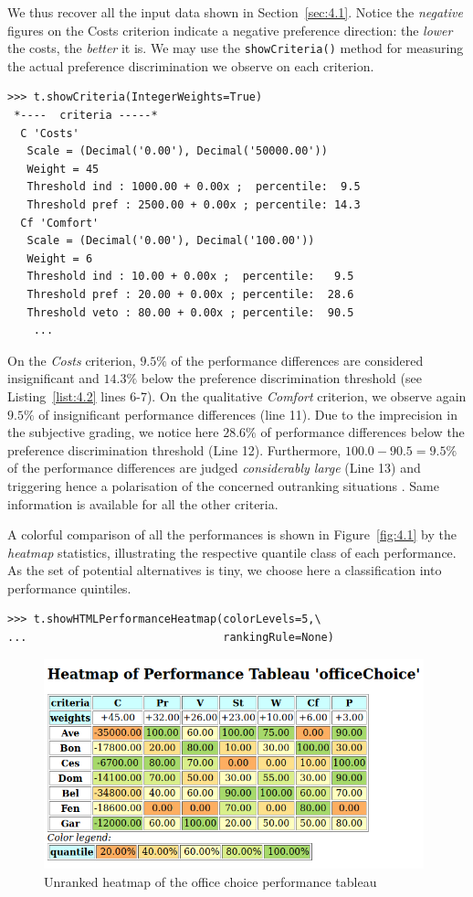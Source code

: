 We thus recover all the input data shown in Section~\vref{sec:4.1}. Notice the \emph{negative} figures on the Costs criterion indicate a negative preference direction: the \emph{lower} the costs, the \emph{better} it is. We may use the \texttt{showCriteria()} method for measuring the actual preference discrimination we observe on each criterion.
\begin{lstlisting}[caption={Inspecting the performance criteria.},label=list:4.2]
>>> t.showCriteria(IntegerWeights=True)
 *----  criteria -----*
  C 'Costs'
   Scale = (Decimal('0.00'), Decimal('50000.00'))
   Weight = 45
   Threshold ind : 1000.00 + 0.00x ;  percentile:  9.5
   Threshold pref : 2500.00 + 0.00x ; percentile: 14.3
  Cf 'Comfort'
   Scale = (Decimal('0.00'), Decimal('100.00'))
   Weight = 6
   Threshold ind : 10.00 + 0.00x ;  percentile:   9.5
   Threshold pref : 20.00 + 0.00x ; percentile:  28.6
   Threshold veto : 80.00 + 0.00x ; percentile:  90.5
    ...
\end{lstlisting}
On the \emph{Costs} criterion, $9.5\%$ of the performance differences are considered insignificant and $14.3\%$ below the preference discrimination threshold (see Listing~\vref{list:4.2} lines 6-7). On the qualitative \emph{Comfort} criterion, we observe again $9.5\%$ of insignificant performance differences (line 11). Due to the imprecision in the subjective grading, we notice here $28.6\%$ of performance differences below the preference discrimination threshold (Line 12). Furthermore, $100.0 - 90.5 = 9.5\%$ of the performance differences are judged \emph{considerably large} (Line 13) and triggering hence a polarisation of the concerned outranking situations \citep{BIS-2013}. Same information is available for all the other criteria. 
 
A colorful comparison of all the performances is shown in Figure~\vref{fig:4.1} by the \emph{heatmap} statistics, illustrating the respective quantile class of each performance. As the set of potential alternatives is tiny, we choose here a classification into performance quintiles.
\begin{lstlisting}
>>> t.showHTMLPerformanceHeatmap(colorLevels=5,\
...                              rankingRule=None)
\end{lstlisting}
    \begin{figure}[h]
\includegraphics[width=11cm]{Figures/4-1-officeChoiceHeatmap.png}
\caption{Unranked heatmap of the office choice performance tableau}
\label{fig:4.1}       %
\end{figure}

